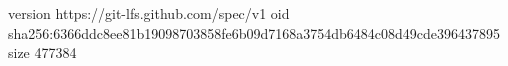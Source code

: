 version https://git-lfs.github.com/spec/v1
oid sha256:6366ddc8ee81b19098703858fe6b09d7168a3754db6484c08d49cde396437895
size 477384
